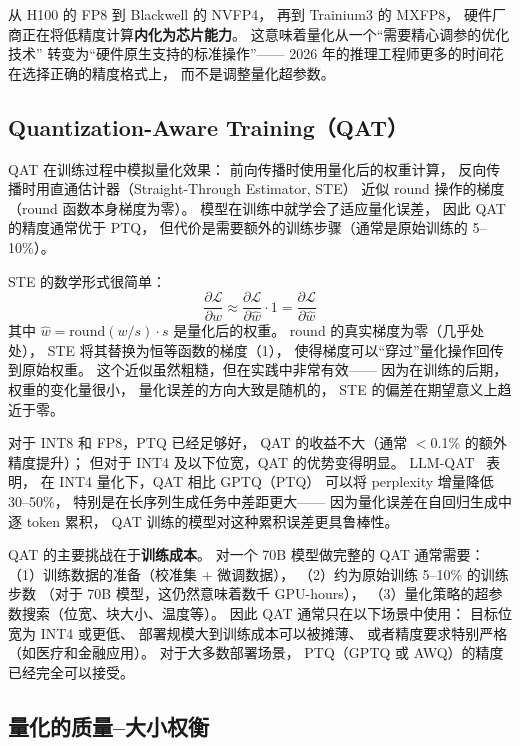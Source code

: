从 H100 的 FP8 到 Blackwell 的 NVFP4，
再到 Trainium3 的 MXFP8，
硬件厂商正在将低精度计算\textbf{内化为芯片能力}。
这意味着量化从一个``需要精心调参的优化技术''
转变为``硬件原生支持的标准操作''——
2026 年的推理工程师更多的时间花在选择正确的精度格式上，
而不是调整量化超参数。

\subsection{Quantization-Aware Training（QAT）}

QAT 在训练过程中模拟量化效果：
前向传播时使用量化后的权重计算，
反向传播时用直通估计器（Straight-Through Estimator, STE）
近似 round 操作的梯度（round 函数本身梯度为零）。
模型在训练中就学会了适应量化误差，
因此 QAT 的精度通常优于 PTQ，
但代价是需要额外的训练步骤（通常是原始训练的 5--10\%）。

STE 的数学形式很简单：
\begin{equation}
  \frac{\partial \mathcal{L}}{\partial w} \approx
  \frac{\partial \mathcal{L}}{\partial \hat{w}} \cdot 1
  = \frac{\partial \mathcal{L}}{\partial \hat{w}}
\end{equation}
其中 $\hat{w} = \mathrm{round}(w/s) \cdot s$ 是量化后的权重。
$\mathrm{round}$ 的真实梯度为零（几乎处处），
STE 将其替换为恒等函数的梯度（1），
使得梯度可以``穿过''量化操作回传到原始权重。
这个近似虽然粗糙，但在实践中非常有效——
因为在训练的后期，权重的变化量很小，
量化误差的方向大致是随机的，
STE 的偏差在期望意义上趋近于零。

对于 INT8 和 FP8，PTQ 已经足够好，
QAT 的收益不大（通常 $<$0.1\% 的额外精度提升）；
但对于 INT4 及以下位宽，QAT 的优势变得明显。
LLM-QAT~\cite{liu2024llmqat} 表明，
在 INT4 量化下，QAT 相比 GPTQ（PTQ）
可以将 perplexity 增量降低 30--50\%，
特别是在长序列生成任务中差距更大——
因为量化误差在自回归生成中逐 token 累积，
QAT 训练的模型对这种累积误差更具鲁棒性。

QAT 的主要挑战在于\textbf{训练成本}。
对一个 70B 模型做完整的 QAT 通常需要：
（1）训练数据的准备（校准集 + 微调数据），
（2）约为原始训练 5--10\% 的训练步数
（对于 70B 模型，这仍然意味着数千 GPU-hours），
（3）量化策略的超参数搜索（位宽、块大小、温度等）。
因此 QAT 通常只在以下场景中使用：
目标位宽为 INT4 或更低、
部署规模大到训练成本可以被摊薄、
或者精度要求特别严格（如医疗和金融应用）。
对于大多数部署场景，
PTQ（GPTQ 或 AWQ）的精度已经完全可以接受。

\subsection{量化的质量--大小权衡}

